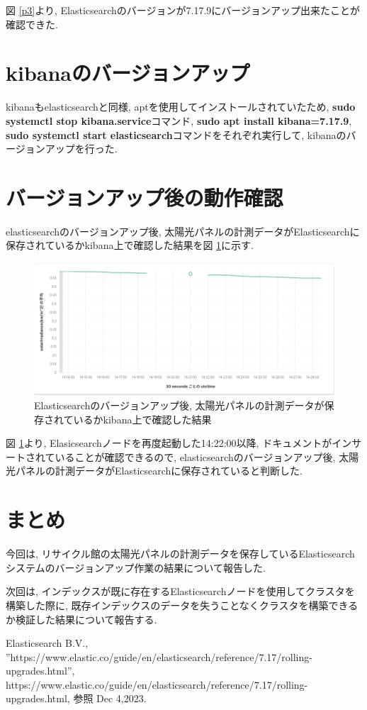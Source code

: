 \documentclass[a4j,12pt,]{jarticle}
\begin{document}
図 \ref{p3}より, Elasticsearchのバージョンが7.17.9にバージョンアップ出来たことが確認できた.

\section{kibanaのバージョンアップ}

kibanaもelasticsearchと同様, aptを使用してインストールされていたため, \textbf{sudo systemctl stop kibana.service}コマンド, \textbf{sudo apt install kibana=7.17.9}, \textbf{sudo systemctl start elasticsearch}コマンドをそれぞれ実行して, kibanaのバージョンアップを行った.

\section{バージョンアップ後の動作確認}

elasticsearchのバージョンアップ後, 太陽光パネルの計測データがElasticsearchに保存されているかkibana上で確認した結果を図 \ref{p4}に示す.

\begin{figure}[H]
  \begin{center}
    \includegraphics[width=160mm]{downtime.png}
    \caption{Elasticsearchのバージョンアップ後, 太陽光パネルの計測データが保存されているかkibana上で確認した結果}
    \label{p4}
  \end{center}
\end{figure}

図 \ref{p4}より, Elasicsearchノードを再度起動した14:22:00以降, ドキュメントがインサートされていることが確認できるので, elasticsearchのバージョンアップ後, 太陽光パネルの計測データがElasticsearchに保存されていると判断した.

\section{まとめ}
今回は, リサイクル館の太陽光パネルの計測データを保存しているElasticsearchシステムのバージョンアップ作業の結果について報告した.

次回は, インデックスが既に存在するElasticsearchノードを使用してクラスタを構築した際に, 既存インデックスのデータを失うことなくクラスタを構築できるか検証した結果について報告する.

\begin{thebibliography}{5}
  Elasticsearch B.V.,\\ ”https://www.elastic.co/guide/en/elasticsearch/reference/7.17/rolling-upgrades.html”, https://www.elastic.co/guide/en/elasticsearch/reference/7.17/rolling-upgrades.html, 参照 Dec 4,2023.
\end{thebibliography}
\end{document}
